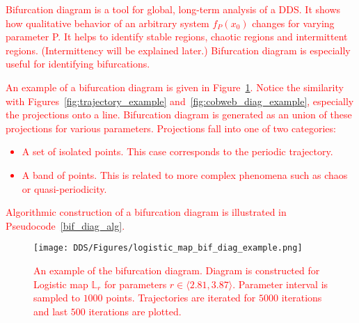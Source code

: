 
\label{def: bif_diag} 
\begin{remark}
    \textcolor{red}{
    Bifurcation diagram is a tool for global, long-term analysis of a DDS.
    It shows how qualitative behavior of an arbitrary system $f_P(x_0)$ changes for varying parameter P.
    It helps to identify stable regions, chaotic regions and intermittent regions. (Intermittency will be explained later.)
    Bifurcation diagram is especially useful for identifying bifurcations.
    }
    \par
    \textcolor{red}{
    An example of a bifurcation diagram is given in Figure~\ref{fig:bif_diag_example}.
    Notice the similarity with Figures~\ref{fig:trajectory_example} and~\ref{fig:cobweb_diag_example}, especially the projections onto a line.
    Bifurcation diagram is generated as an union of these projections for various parameters.
    Projections fall into one of two categories:
    \begin{itemize}
        \item{A set of isolated points. This case corresponds to the periodic trajectory.}
        \item{A band of points. This is related to more complex phenomena such as chaos or quasi-periodicity.}
    \end{itemize}
    }
    \par
    \textcolor{red}{
    Algorithmic construction of a bifurcation diagram is illustrated in Pseudocode~\ref{bif_diag_alg}.
    }
\end{remark}

\begin{figure}[!h]
    \centering
    \texttt{[image: DDS/Figures/logistic\_map\_bif\_diag\_example.png]}
    \caption{
        \textcolor{red}{
        An example of the bifurcation diagram. 
        Diagram is constructed for Logistic map $\mathbb{L}_{r}$ for parameters $r \in \langle 2.81, 3.87 \rangle$. 
        Parameter interval is sampled to $1000$ points. 
        Trajectories are iterated for $5000$ iterations and last $500$ iterations are plotted.
        }
    }
    \label{fig:bif_diag_example}
\end{figure}

